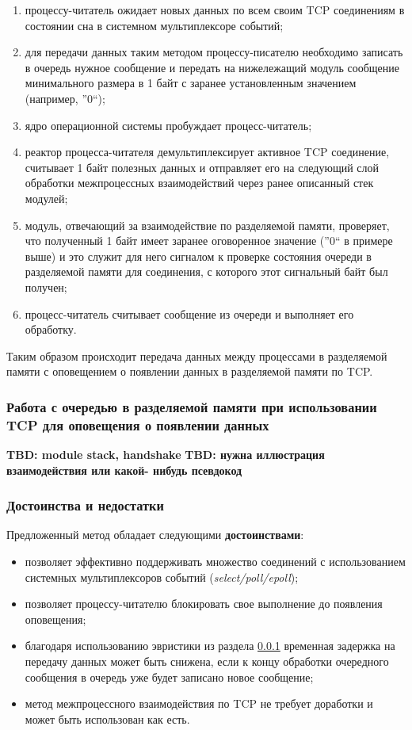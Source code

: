 \begin{enumerate}
\item процессу-читатель ожидает новых данных по всем своим TCP соединениям в состоянии сна в системном мультиплексоре событий;
\item для передачи данных таким методом процессу-писателю необходимо записать в очередь нужное сообщение и передать на нижележащий модуль сообщение минимального размера в 1 байт с заранее установленным значением (например, ''0``);
\item ядро операционной системы пробуждает процесс-читатель;
\item реактор процесса-читателя демультиплексирует активное TCP соединение, считывает 1 байт полезных данных и отправляет его на следующий слой обработки межпроцессных взаимодействий через ранее описанный стек модулей;
\item модуль, отвечающий за взаимодействие по разделяемой памяти, проверяет, что полученный 1 байт имеет заранее оговоренное значение (''0`` в примере выше) и это служит для него сигналом к проверке состояния очереди в разделяемой памяти для соединения, с которого этот сигнальный байт был получен;
\item процесс-читатель считывает сообщение из очереди и выполняет его обработку.
\end{enumerate}

Таким образом происходит передача данных между процессами в разделяемой памяти с оповещением о появлении данных в разделяемой памяти по TCP.

\subsubsection{Работа с очередью в разделяемой памяти при использовании TCP для оповещения о появлении данных}\label{chapter31:SharedMemoryOptimization}

\textbf{TBD: module stack, handshake}
\textbf{TBD: нужна иллюстрация взаимодействия или какой- нибудь псевдокод}

\subsubsection{Достоинства и недостатки}

Предложенный метод обладает следующими \textbf{достоинствами}:
\begin{itemize}
\item позволяет эффективно поддерживать множество соединений с использованием системных мультиплексоров событий (\textit{select/poll/epoll});
\item позволяет процессу-читателю блокировать свое выполнение до появления оповещения;
\item благодаря использованию эвристики из раздела \ref{chapter31:SharedMemoryOptimization} временная задержка на передачу данных может быть снижена, если к концу обработки очередного сообщения в очередь уже будет записано новое сообщение;
\item метод межпроцессного взаимодействия по TCP не требует доработки и может быть использован как есть.
\end{itemize}

